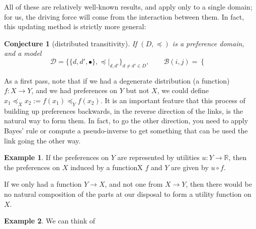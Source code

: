 \documentclass{article}
\theoremstyle{plain}
\newtheorem{conj}[theorem]{Conjecture}
\theoremstyle{definition}
\newtheorem{example}{Example}[section]
\theoremstyle{remark}
\newcommand\leqc{\preccurlyeq}
\begin{document}
	All of these are relatively well-known results, and apply only to a single domain; for us, the driving force will come from the interaction between them. In fact, this updating method is strictly more general:

	\begin{conj}[distributed transitivity]
		If $(D, \leqc)$ is a preference domain, and a model 
		\[ \mathcal D = \Big\{ \{d, d', \bullet\}, \leqc\Big|_{d,d'} \Big\}_{d \neq d' \in D},\qquad
			\mathcal B(i,j) = \begin{cases}
				
			\end{cases}
			\] 
	\end{conj}
	
	As a first pass, note that if we had a degenerate distribution (a function) $f : X \to Y$, and we had preferences on $Y$ but not $X$, we could define $x_1 \leqc_X x_2 := f(x_1) \leqc_Y f(x_2)$. It is an important feature that this process of building up preferences backwards, in the reverse direction of the links, is the natural way to form them. In fact, to go the other direction, you need to apply Bayes' rule or compute a pseudo-inverse to get something that can be used the link going the other way. 
	
	\begin{example}
		If the preferences on $Y$ are represented by utilities $u : Y \to \mathbb R$, then the preferences on $X$ induced by a functionX $f$ and $Y$ are given by $u \circ f$. 
		
		\begin{center}
		\end{center}
		
		If we only had a function $Y \to X$, and not one from $X \to Y$, then there would be no natural composition of the parts at our disposal to form a utility function on $X$.
	\end{example}
	
	\begin{example}
		We can think of
	\end{example}\vspace{1.5em}	
\end{document}
